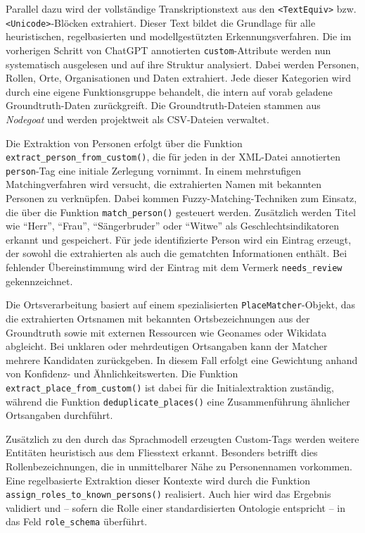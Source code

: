 \documentclass[12pt, a4paper, ngerman, bidi=default]{article}
\newcommand{\code}[1]{\colorbox{VeryLightGray}{\texttt{#1}}} %
\begin{document}
Parallel dazu wird der vollständige Transkriptionstext aus den \code{<TextEquiv>} bzw. \code{<Unicode>}-Blöcken extrahiert. Dieser 
Text bildet die Grundlage für alle heuristischen, regelbasierten und modellgestützten Erkennungsverfahren. Die im vorherigen Schritt von 
ChatGPT annotierten \code{custom}-Attribute werden nun systematisch ausgelesen und auf ihre Struktur analysiert. Dabei werden Personen, 
Rollen, Orte, Organisationen und Daten extrahiert. Jede dieser Kategorien wird durch eine eigene Funktionsgruppe behandelt, die intern auf 
vorab geladene Groundtruth-Daten zurückgreift. Die Groundtruth-Dateien stammen aus \textit{Nodegoat} und werden projektweit als 
CSV-Dateien verwaltet.

Die Extraktion von Personen erfolgt über die Funktion \code{extract\_person\_from\_custom()}, die für jeden in der XML-Datei 
annotierten \code{person}-Tag eine initiale Zerlegung vornimmt. In einem mehrstufigen Matchingverfahren wird versucht, die 
extrahierten Namen mit bekannten Personen zu verknüpfen. Dabei kommen Fuzzy-Matching-Techniken zum Einsatz, die über die Funktion 
\code{match\_person()} gesteuert werden. Zusätzlich werden Titel wie \enquote{Herr}, \enquote{Frau}, \enquote{Sängerbruder} oder 
\enquote{Witwe} als Geschlechtsindikatoren erkannt und gespeichert. Für jede identifizierte Person wird ein Eintrag erzeugt, der sowohl 
die extrahierten als auch die gematchten Informationen enthält. Bei fehlender Übereinstimmung wird der Eintrag mit dem Vermerk 
\code{needs\_review} gekennzeichnet.

Die Ortsverarbeitung basiert auf einem spezialisierten \code{PlaceMatcher}-Objekt, das die extrahierten Ortsnamen mit bekannten 
Ortsbezeichnungen aus der Groundtruth sowie mit externen Ressourcen wie Geonames oder Wikidata abgleicht. Bei unklaren oder 
mehrdeutigen Ortsangaben kann der Matcher mehrere Kandidaten zurückgeben. In diesem Fall erfolgt eine Gewichtung anhand von 
Konfidenz- und Ähnlichkeitswerten. Die Funktion \code{extract\_place\_from\_custom()} ist dabei für die Initialextraktion 
zuständig, während die Funktion \code{deduplicate\_places()} eine Zusammenführung ähnlicher Ortsangaben durchführt.

Zusätzlich zu den durch das Sprachmodell erzeugten Custom-Tags werden weitere Entitäten heuristisch aus dem Fliesstext erkannt. 
Besonders betrifft dies Rollenbezeichnungen, die in unmittelbarer Nähe zu Personennamen vorkommen. Eine regelbasierte Extraktion 
dieser Kontexte wird durch die Funktion \code{assign\_roles\_to\_known\_persons()} realisiert. Auch hier wird das Ergebnis validiert 
und – sofern die Rolle einer standardisierten Ontologie entspricht – in das Feld \code{role\_schema} überführt.
\end{document}
